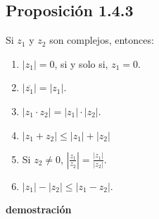 \documentclass[11pt]{article}
\begin{document}
\subsection*{Proposición 1.4.3} Si $z_1$ y $z_2$ son complejos, entonces: \begin{enumerate}[label=\roman*)]
  \item $|z_1|=0$, si y solo si, $z_1=0$.
  \item $|\overline{z_1}| =|z_1|$.
  \item $|z_1\cdot z_2|=|z_1|\cdot|z_2|$.
  \item $|z_1+z_2|\leq |z_1|+|z_2|$
  \item Si $z_2\neq 0$, $|\frac{z_1}{z_2}|= \frac{|z_1|}{|z_2|}$.
  \item $|z_1|-|z_2|\leq |z_1-z_2|$.
\end{enumerate}

\textbf{demostración}
\end{document}
